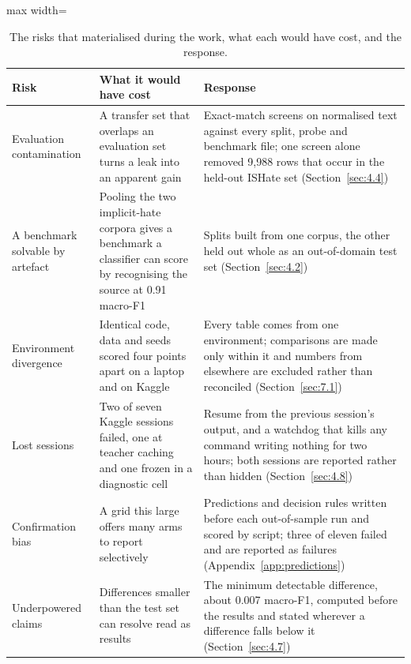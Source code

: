 \begin{table}[htbp]
\centering
\small
\caption[Risks that materialised, and the response to each]{The risks that materialised during the
work, what each would have cost, and the response.}
\label{tab:risks}
\begin{adjustbox}{max width=\textwidth}
\begin{tabular}{p{3.1cm}p{4.6cm}p{5.6cm}}
\toprule
Risk & What it would have cost & Response \\
\midrule
Evaluation contamination & A transfer set that overlaps an evaluation set turns a leak into an
apparent gain & Exact-match screens on normalised text against every split, probe and benchmark file;
one screen alone removed 9,988 rows that occur in the held-out ISHate set
(Section~\ref{sec:4.4}) \\
A benchmark solvable by artefact & Pooling the two implicit-hate corpora gives a benchmark a
classifier can score by recognising the source at 0.91 macro-F1 & Splits built from one corpus, the
other held out whole as an out-of-domain test set (Section~\ref{sec:4.2}) \\
Environment divergence & Identical code, data and seeds scored four points apart on a laptop and on
Kaggle & Every table comes from one environment; comparisons are made only within it and numbers from
elsewhere are excluded rather than reconciled (Section~\ref{sec:7.1}) \\
Lost sessions & Two of seven Kaggle sessions failed, one at teacher caching and one frozen in a
diagnostic cell & Resume from the previous session's output, and a watchdog that kills any command
writing nothing for two hours; both sessions are reported rather than hidden
(Section~\ref{sec:4.8}) \\
Confirmation bias & A grid this large offers many arms to report selectively & Predictions and
decision rules written before each out-of-sample run and scored by script; three of eleven failed and
are reported as failures (Appendix~\ref{app:predictions}) \\
Underpowered claims & Differences smaller than the test set can resolve read as results & The minimum
detectable difference, about 0.007 macro-F1, computed before the results and stated wherever a
difference falls below it (Section~\ref{sec:4.7}) \\
\bottomrule
\end{tabular}
\end{adjustbox}
\end{table}

